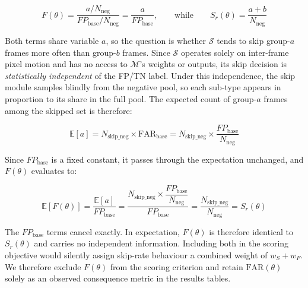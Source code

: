 \[ F(\theta)
= \frac{a / N_{\text{neg}}}{FP_{\text{base}} / N_{\text{neg}}}
= \frac{a}{FP_{\text{base}}},
\qquad \text{while} \qquad
S_r(\theta) = \frac{a + b}{N_{\text{neg}}} \]

Both terms share variable $a$, so the question is whether $\mathcal{S}$ tends
to skip group-$a$ frames more often than group-$b$ frames.
Since $\mathcal{S}$ operates solely on inter-frame pixel motion and has no
access to $\mathcal{M}$'s weights or outputs, its skip decision is
\emph{statistically independent} of the FP/TN label.
Under this independence, the skip module samples blindly from the negative pool,
so each sub-type appears in proportion to its share in the full pool.
The expected count of group-$a$ frames among the skipped set is therefore:

\[ \mathbb{E}[a]
= N_{\text{skip\_neg}} \times \mathrm{FAR}_{\text{base}}
= N_{\text{skip\_neg}} \times \frac{FP_{\text{base}}}{N_{\text{neg}}} \]

Since $FP_{\text{base}}$ is a fixed constant, it passes through the expectation
unchanged, and $F(\theta)$ evaluates to:

\[ \mathbb{E}[F(\theta)]
= \frac{\mathbb{E}[a]}{FP_{\text{base}}}
= \frac{N_{\text{skip\_neg}} \times \dfrac{FP_{\text{base}}}{N_{\text{neg}}}}{FP_{\text{base}}}
= \frac{N_{\text{skip\_neg}}}{N_{\text{neg}}}
= S_r(\theta) \]

The $FP_{\text{base}}$ terms cancel exactly. In expectation, $F(\theta)$
is therefore identical to $S_r(\theta)$ and carries no independent information.
Including both in the scoring objective would silently assign skip-rate
behaviour a combined weight of $w_S + w_F$. We therefore exclude $F(\theta)$
from the scoring criterion and retain $\mathrm{FAR}(\theta)$ solely as an
observed consequence metric in the results tables.







